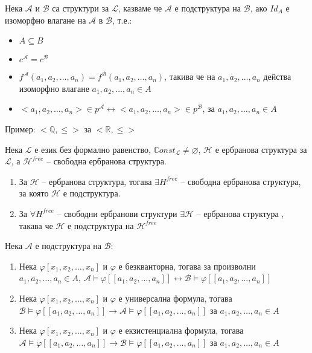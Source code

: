 \documentclass{article}
\begin{document}
\begin{mydef}[Подструктура]
Нека $\mathcal{A}$ и $\mathcal{B}$ са структури за $\mathcal{L}$, казваме че $\mathcal{A}$ е подструктура на $\mathcal{B}$, ако $I\!d_A$ е изоморфно влагане на $\mathcal{A}$ в $\mathcal{B}$, т.е.:
\begin{itemize}
\item $A \subseteq B$
\item $c^\mathcal{A} = c^\mathcal{B}$
\item $f^\mathcal{A}(a_1, a_2, \ldots, a_n) = f^\mathcal{B}(a_1, a_2, \ldots, a_n)$, такива че на $a_1, a_2, \ldots, a_n$ действа изоморфно влагане $a_1, a_2, \ldots, a_n \in A$
\item $<a_1, a_2, \ldots, a_n> \in p^\mathcal{A} \longleftrightarrow <a_1, a_2, \ldots, a_n> \in p^\mathcal{B}$, за $a_1, a_2, \ldots, a_n \in A$
\end{itemize}

Пример: $<\mathbb{Q}, \leq>$ за $<\mathbb{R}, \leq>$
\end{mydef}

\begin{mydef}
Нека $\mathcal{L}$ е език без формално равенство, $\mathbb{C}onst_\mathcal{L} \neq \varnothing$, $\mathcal{H}$ е ербранова структура за $\mathcal{L}$, а $\mathcal{H}^{free}$ -- свободна ербранова структура.

\begin{enumerate}
\item За $\mathcal{H}$ -- ербранова структура, тогава $\exists H^{free}$ -- свободна ербранова структура, за която $\mathcal{H}$ е подструктура.
\item За $\forall H^{free}$ -- свободни ербранови структури $\exists \mathcal{H}$ -- ербранова структура , такава че $\mathcal{H}$ е подструктура на $\mathcal{H}^{free}$
\end{enumerate}
\end{mydef}

\begin{mydef}
Нека $\mathcal{A}$ е подструктура на $\mathcal{B}$:
\begin{enumerate}
\item Нека $\varphi[x_1, x_2, \ldots, x_n]$ и $\varphi$ е безкванторна, тогава за произволни $a_1, a_2, \ldots, a_n \in A$, $\mathcal{A} \models \varphi[\![a_1, a_2, \ldots, a_n]\!] \longleftrightarrow \mathcal{B} \models \varphi[\![a_1, a_2, \ldots, a_n]\!]$
\item Нека $\varphi[x_1, x_2, \ldots, x_n]$ и $\varphi$ е универсална формула, тогава $\mathcal{B} \models \varphi[\![a_1, a_2, \ldots, a_n]\!] \longrightarrow \mathcal{A} \models \varphi[\![a_1, a_2, \ldots, a_n]\!]$ за $a_1, a_2, \ldots, a_n \in A$
\item Нека $\varphi[x_1, x_2, \ldots, x_n]$ и $\varphi$ е екзистенциална формула, тогава  $\mathcal{A} \models \varphi[\![a_1, a_2, \ldots, a_n]\!] \longrightarrow \mathcal{B} \models \varphi[\![a_1, a_2, \ldots, a_n]\!]$ за $a_1, a_2, \ldots, a_n \in A$
\end{enumerate}
\end{mydef}
\end{document}
